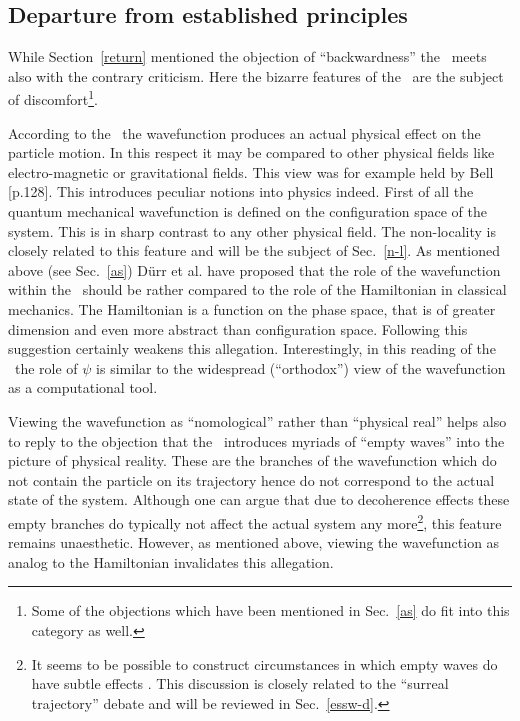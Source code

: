 \subsection{Departure from established principles}
While Section~\ref{return} mentioned the objection of ``backwardness'' the \dbb\ 
meets also with the contrary criticism. Here the bizarre features of the \dbb\ are the subject of 
discomfort\footnote{Some of the objections which have been mentioned in Sec.~\ref{as} do fit into this category as well.}.

According to the \dbb\ the wavefunction produces an actual physical effect on the particle motion. 
In this respect it may be compared to other physical fields like 
electro-magnetic or gravitational fields. This view was for example held by Bell \cite{speakable}[p.128]. 
This introduces peculiar notions into physics indeed. 
First of all the quantum mechanical wavefunction is defined on the configuration space of the system. 
This is in sharp contrast to any other physical field. The non-locality is closely related 
to this feature and will be the subject of Sec.~\ref{n-l}.
As mentioned above (see Sec.~\ref{as}) D\"urr et al. \cite{duerr97} have proposed that the role of the wavefunction 
within the \dbb\ should be rather compared to the role of the Hamiltonian in classical mechanics. 
The Hamiltonian is a function on the phase space, that is of greater dimension and even more abstract than 
configuration space. Following this suggestion certainly weakens this allegation. Interestingly, in this reading of the \dbb\
the role of $\psi$ is similar to the widespread (``orthodox'') view of the wavefunction as a computational tool. 

Viewing the wavefunction as ``nomological'' rather than ``physical real'' helps also to reply to the objection
that the \dbb\ introduces myriads of ``empty waves'' into the picture of physical reality. These are the branches of the wavefunction 
which do not contain the particle on its trajectory hence do not correspond to the actual state of the system.
Although one can argue that due to decoherence effects these empty branches  
do typically not affect the actual system any more\footnote{It seems to be possible to construct circumstances in which empty 
waves do have subtle effects \cite{hardy,vaidman}. This discussion is closely related to the ``surreal trajectory'' debate and will 
be reviewed in Sec.~\ref{essw-d}.}, this feature remains unaesthetic. However, as mentioned above, viewing the wavefunction as 
analog to the Hamiltonian invalidates this allegation.

